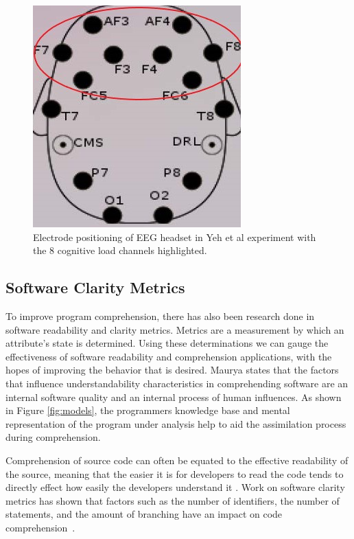 \begin{figure}[ht]
\centering
\includegraphics[scale=0.75]{images/EEG}
\caption{Electrode positioning of EEG headset in Yeh et al experiment with the 8 cognitive load channels highlighted.\cite{yeh_detecting_2017}}
\label{fig:EEG}
\end{figure}



\subsection{Software Clarity Metrics}
To improve program comprehension, there has also been research done in software readability and clarity
metrics. Metrics are a measurement by which an attribute's state is determined. Using these determinations
we can gauge the effectiveness of software readability and comprehension applications, with the hopes of
improving the behavior that is desired. Maurya states that the factors that influence understandability
characteristics in comprehending software are an internal software quality and an internal process of
human influences\cite{maurya_software_nodate}. As shown in Figure \ref{fig:models}, the programmers
knowledge base and mental representation of the program under analysis help to aid the assimilation
process during comprehension.  
  
Comprehension of source code can often be equated to the effective readability of the source, meaning that
the easier it is for developers to read the code tends to directly effect how easily the developers
understand it \cite{dorn_general_nodate}. Work on software clarity metrics has shown that factors such as
the number of identifiers, the number of
statements, and the amount of branching have an impact on code comprehension~\cite{brooks_towards_1983}.

